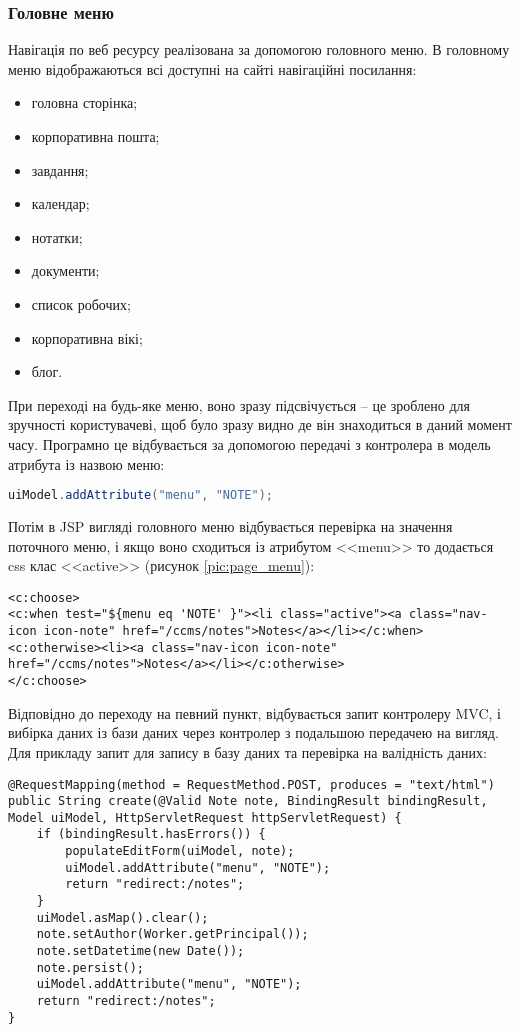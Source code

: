 \subsubsection{Головне меню}
\par Навігація по веб ресурсу реалізована за допомогою головного меню. В головному меню відображаються всі доступні на сайті навігаційні посилання:
\begin{itemize}
  \item головна сторінка;
  \item корпоративна пошта;
  \item завдання;
  \item календар;
  \item нотатки;
  \item документи;
  \item список робочих;
  \item корпоративна вікі;
  \item блог.
\end{itemize}
\par При переході на будь-яке меню, воно зразу підсвічується -- це зроблено для зручності користувачеві, щоб було зразу видно де він знаходиться в даний момент часу. Програмно це відбувається за допомогою передачі з контролера в модель атрибута із назвою меню:
\begin{lstlisting}[language=Java]
uiModel.addAttribute("menu", "NOTE");
\end{lstlisting}
\par Потім в JSP вигляді головного меню відбувається перевірка на значення поточного меню, і якщо воно сходиться із атрибутом <<menu>> то додається css клас <<active>> (рисунок \ref{pic:page_menu}):

\begin{lstlisting}
<c:choose>
<c:when test="${menu eq 'NOTE' }"><li class="active"><a class="nav-icon icon-note" href="/ccms/notes">Notes</a></li></c:when>
<c:otherwise><li><a class="nav-icon icon-note" href="/ccms/notes">Notes</a></li></c:otherwise>
</c:choose>
\end{lstlisting}

\par Відповідно до переходу на певний пункт, відбувається запит контролеру MVC, і вибірка даних із бази даних через контролер з подальшою передачею на вигляд. Для прикладу запит для запису в базу даних та перевірка на валідність даних:
\begin{lstlisting}
@RequestMapping(method = RequestMethod.POST, produces = "text/html")
public String create(@Valid Note note, BindingResult bindingResult, Model uiModel, HttpServletRequest httpServletRequest) {
    if (bindingResult.hasErrors()) {
        populateEditForm(uiModel, note);
        uiModel.addAttribute("menu", "NOTE");
        return "redirect:/notes";
    }
    uiModel.asMap().clear();
    note.setAuthor(Worker.getPrincipal());
    note.setDatetime(new Date());
    note.persist();
    uiModel.addAttribute("menu", "NOTE");
    return "redirect:/notes";
}
\end{lstlisting}

